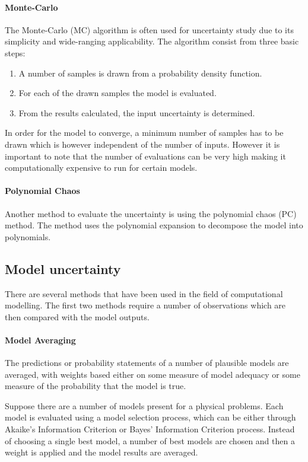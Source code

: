 \paragraph{Monte-Carlo}
The Monte-Carlo (MC) algorithm is often used for uncertainty study due to its simplicity and wide-ranging applicability. The algorithm consist from three basic steps:
\begin{enumerate}
    \item A number of samples is drawn from a probability density function.
    \item For each of the drawn samples the model is evaluated.
    \item From the results calculated, the input uncertainty is determined.
\end{enumerate}
In order for the model to converge, a minimum number of samples has to be drawn which is however independent of the number of inputs. However it is important to note that the number of evaluations can be very high making it computationally expensive to run for certain models. 

\paragraph{Polynomial Chaos}
Another method to evaluate the uncertainty is using the polynomial chaos (PC) method. The method uses the polynomial expansion to decompose the model into polynomials. 

\subsection{Model uncertainty}
There are several methods that have been used in the field of computational modelling. The first two methods require a number of observations which are then compared with the model outputs. \par

\paragraph{Model Averaging}
The predictions or probability statements of a number of plausible models are averaged, with weights based either on some measure of model adequacy or some measure of the probability that the model is true. \par

Suppose there are a number of models present for a physical problems. Each model is evaluated using a model selection process, which can be either through Akaike's Information Criterion or Bayes' Information Criterion process. Instead of choosing a single best model, a number of best models are chosen and then a weight is applied and the model results are averaged. \par

